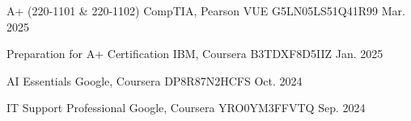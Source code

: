 
\begin{cvhonors}

	\cvhonor
	{A+ (220-1101 \& 220-1102)} 
	{CompTIA, Pearson VUE} 
	{G5LN05LS51Q41R99}
	{Mar. 2025}

	\cvhonor
	{Preparation for A+ Certification} %
	{IBM, Coursera} %
	{B3TDXF8D5IIZ} %
	{Jan. 2025} %

	\cvhonor
	{AI Essentials} %
	{Google, Coursera} %
	{DP8R87N2HCFS} %
	{Oct. 2024} %

	\cvhonor
	{IT Support Professional} %
	{Google, Coursera} %
	{YRO0YM3FFVTQ} %
	{Sep. 2024} %


\end{cvhonors}
